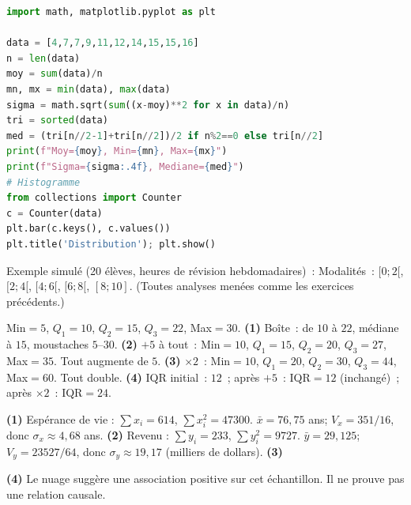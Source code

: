 
\begin{lstlisting}[language=Python]
import math, matplotlib.pyplot as plt

data = [4,7,7,9,11,12,14,15,15,16]
n = len(data)
moy = sum(data)/n
mn, mx = min(data), max(data)
sigma = math.sqrt(sum((x-moy)**2 for x in data)/n)
tri = sorted(data)
med = (tri[n//2-1]+tri[n//2])/2 if n%2==0 else tri[n//2]
print(f"Moy={moy}, Min={mn}, Max={mx}")
print(f"Sigma={sigma:.4f}, Mediane={med}")
# Histogramme
from collections import Counter
c = Counter(data)
plt.bar(c.keys(), c.values())
plt.title('Distribution'); plt.show()
\end{lstlisting}


Exemple simul\'e (20 \'el\`eves, heures de r\'evision hebdomadaires)~:
Modalit\'es~: $[0;2[$, $[2;4[$, $[4;6[$, $[6;8[$, $[8;10]$.
(Toutes analyses men\'ees comme les exercices pr\'ec\'edents.)


Min$=5$, $Q_1=10$, $Q_2=15$, $Q_3=22$, Max$=30$.
\textbf{(1)} Bo\^ite~: de $10$ \`a $22$, m\'ediane \`a $15$, moustaches $5$--$30$.
\textbf{(2)} $+5$ \`a tout~: Min$=10$, $Q_1=15$, $Q_2=20$, $Q_3=27$, Max$=35$. Tout augmente de $5$.
\textbf{(3)} $\times2$~: Min$=10$, $Q_1=20$, $Q_2=30$, $Q_3=44$, Max$=60$. Tout double.
\textbf{(4)} IQR initial~: $12$~; apr\`es $+5$~: IQR$=12$ (inchang\'e)~; apr\`es $\times2$~: IQR$=24$.


\textbf{(1)} Esp\'erance de vie : $\sum x_i=614$, $\sum x_i^2=47300$.
$\bar x=76{,}75$ ans; $V_x=351/16$, donc $\sigma_x\approx4{,}68$ ans.
\textbf{(2)} Revenu : $\sum y_i=233$, $\sum y_i^2=9727$.
$\bar y=29{,}125$; $V_y=23527/64$, donc $\sigma_y\approx19{,}17$ (milliers de dollars).
\textbf{(3)}
\begin{center}
\end{center}
\textbf{(4)} Le nuage sugg\`ere une association positive sur cet \'echantillon.
Il ne prouve pas une relation causale.

